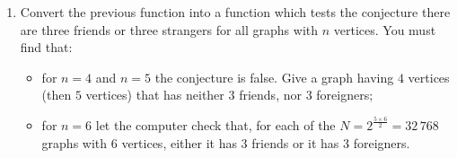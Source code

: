 \documentclass[11pt,class=report,crop=false]{standalone}
\begin{document}
\begin{activite}[Ramsey's theorem for $n=6$]
\begin{enumerate}
  \item Convert the previous function into a  function
which tests the conjecture \og{}there are three friends or three strangers\fg{} for all graphs with $n$ vertices.
You must find that:
\begin{itemize}
\item for $n=4$ and $n=5$ the conjecture is false. Give a graph having $4$ vertices (then $5$ vertices) that has neither $3$ friends, nor $3$ foreigners;
\item for $n=6$ let the computer check that, for each of the $N = 2^{\frac{5 \times 6}{2}} = 32\,768$ graphs with $6$ vertices, either it has $3$ friends or it has $3$ foreigners.
\end{itemize}
\end{enumerate}   
     
\end{activite}
\end{document}
